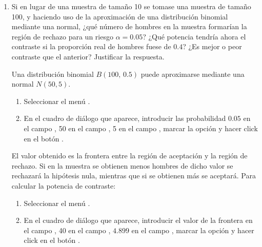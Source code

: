 \begin{enumerate}[leftmargin=*]
\begin{enumerate}
\item Si en lugar de una muestra de tamaño 10 se tomase una muestra de tamaño 100, y haciendo uso de la aproximación de
una distribución binomial mediante una normal, ¿qué número de hombres en la muestra formarían la región de rechazo para
un riesgo $\alpha=0.05$? 
¿Qué potencia tendría ahora el contraste si la proporción real de hombres fuese de $0.4$? 
¿Es mejor o peor contraste que el anterior? 
Justificar la respuesta.
\begin{indicacion}
Una distribución binomial $B(100,\, 0.5)$ puede aproximarse mediante una normal $N(50,5)$.
\begin{enumerate}
\item Seleccionar el menú .
\item En el cuadro de diálogo que aparece, introducir las probabilidad $0.05$ en el campo , 50 en
el campo , 5 en el campo , marcar la opción  y hacer click
en el botón .
\end{enumerate}
El valor obtenido es la frontera entre la región de aceptación y la región de rechazo. 
Si en la muestra se obtienen menos hombres de dicho valor se rechazará la hipótesis nula, mientras que si se obtienen
más se aceptará. 
Para calcular la potencia de contraste:
\begin{enumerate}
\item Seleccionar el menú .
\item En el cuadro de diálogo que aparece, introducir el valor de la frontera en el campo , 40 en el campo , $4.899$ en el campo , marcar la opción  y hacer click en el botón .
\end{enumerate}
\end{indicacion}


\end{enumerate}
\end{enumerate}
